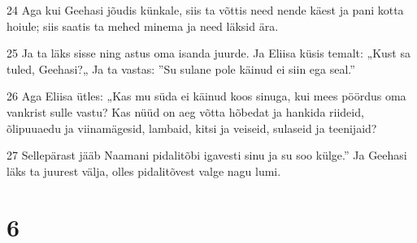 \par 24 Aga kui Geehasi jõudis künkale, siis ta võttis need nende käest ja pani kotta hoiule; siis saatis ta mehed minema ja need läksid ära.
\par 25 Ja ta läks sisse ning astus oma isanda juurde. Ja Eliisa küsis temalt: „Kust sa tuled, Geehasi?„ Ja ta vastas: ”Su sulane pole käinud ei siin ega seal.”
\par 26 Aga Eliisa ütles: „Kas mu süda ei käinud koos sinuga, kui mees pöördus oma vankrist sulle vastu? Kas nüüd on aeg võtta hõbedat ja hankida riideid, õlipuuaedu ja viinamägesid, lambaid, kitsi ja veiseid, sulaseid ja teenijaid?
\par 27 Sellepärast jääb Naamani pidalitõbi igavesti sinu ja su soo külge.” Ja Geehasi läks ta juurest välja, olles pidalitõvest valge nagu lumi.

\chapter{6}

